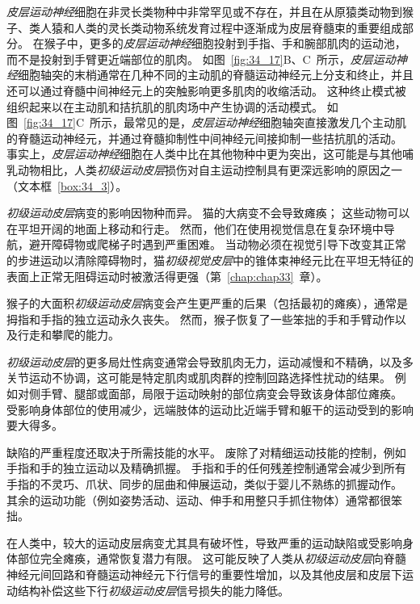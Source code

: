 \textit{皮层运动神经}细胞在非灵长类物种中非常罕见或不存在，并且在从原猿类动物到猴子、类人猿和人类的灵长类动物系统发育过程中逐渐成为皮层脊髓束的重要组成部分。
在猴子中，更多的\textit{皮层运动神经}细胞投射到手指、手和腕部肌肉的运动池，而不是投射到手臂更近端部位的肌肉。
如图~\ref{fig:34_17}B、C~所示，\textit{皮层运动神经}细胞轴突的末梢通常在几种不同的主动肌的脊髓运动神经元上分支和终止，并且还可以通过脊髓中间神经元上的突触影响更多肌肉的收缩活动。
这种终止模式被组织起来以在主动肌和拮抗肌的肌肉场中产生协调的活动模式。
如图~\ref{fig:34_17}C~所示，最常见的是，\textit{皮层运动神经}细胞轴突直接激发几个主动肌的脊髓运动神经元，并通过脊髓抑制性中间神经元间接抑制一些拮抗肌的活动。
事实上，\textit{皮层运动神经}细胞在人类中比在其他物种中更为突出，这可能是与其他哺乳动物相比，人类\textit{初级运动皮层}损伤对自主运动控制具有更深远影响的原因之一（文本框~\ref{box:34_3}）。



\begin{proposition}[初级运动皮层的损伤导致运动执行障碍] \label{box:34_3}
	
	\quad \quad \textit{初级运动皮层}病变的影响因物种而异。
	猫的大病变不会导致瘫痪；
	这些动物可以在平坦开阔的地面上移动和行走。
	然而，他们在使用视觉信息在复杂环境中导航，避开障碍物或爬梯子时遇到严重困难。
	当动物必须在视觉引导下改变其正常的步进运动以清除障碍物时，猫\textit{初级视觉皮层}中的锥体束神经元比在平坦无特征的表面上正常无阻碍运动时被激活得更强（第~\ref{chap:chap33}~章）。
	
	\quad \quad 猴子的大面积\textit{初级运动皮层}病变会产生更严重的后果（包括最初的瘫痪），通常是拇指和手指的独立运动永久丧失。
	然而，猴子恢复了一些笨拙的手和手臂动作以及行走和攀爬的能力。
	
	\quad \quad \textit{初级运动皮层}的更多局灶性病变通常会导致肌肉无力，运动减慢和不精确，以及多关节运动不协调，这可能是特定肌肉或肌肉群的控制回路选择性扰动的结果。
	例如对侧手臂、腿部或面部，局限于运动映射的部位病变会导致该身体部位瘫痪。
	受影响身体部位的使用减少，远端肢体的运动比近端手臂和躯干的运动受到的影响要大得多。
	
	\quad \quad 缺陷的严重程度还取决于所需技能的水平。
	废除了对精细运动技能的控制，例如手指和手的独立运动以及精确抓握。
	手指和手的任何残差控制通常会减少到所有手指的不灵巧、爪状、同步的屈曲和伸展运动，类似于婴儿不熟练的抓握动作。
	其余的运动功能（例如姿势活动、运动、伸手和用整只手抓住物体）通常都很笨拙。
	
	\quad \quad 在人类中，较大的运动皮层病变尤其具有破坏性，导致严重的运动缺陷或受影响身体部位完全瘫痪，通常恢复潜力有限。
	这可能反映了人类从\textit{初级运动皮层}向脊髓神经元间回路和脊髓运动神经元下行信号的重要性增加，以及其他皮层和皮层下运动结构补偿这些下行\textit{初级运动皮层}信号损失的能力降低。
	
\end{proposition}


